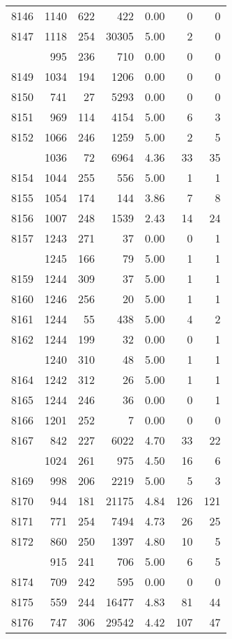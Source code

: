 \documentclass[
]{article}
\begin{document}
\begin{table}
\begin{tabular}[t]{lrrrrrr}
8146 & 1140 & 622 & 422 & 0.00 & 0 & 0\\
8147 & 1118 & 254 & 30305 & 5.00 & 2 & 0\\
\addlinespace
8148 & 995 & 236 & 710 & 0.00 & 0 & 0\\
8149 & 1034 & 194 & 1206 & 0.00 & 0 & 0\\
8150 & 741 & 27 & 5293 & 0.00 & 0 & 0\\
8151 & 969 & 114 & 4154 & 5.00 & 6 & 3\\
8152 & 1066 & 246 & 1259 & 5.00 & 2 & 5\\
\addlinespace
8153 & 1036 & 72 & 6964 & 4.36 & 33 & 35\\
8154 & 1044 & 255 & 556 & 5.00 & 1 & 1\\
8155 & 1054 & 174 & 144 & 3.86 & 7 & 8\\
8156 & 1007 & 248 & 1539 & 2.43 & 14 & 24\\
8157 & 1243 & 271 & 37 & 0.00 & 0 & 1\\
\addlinespace
8158 & 1245 & 166 & 79 & 5.00 & 1 & 1\\
8159 & 1244 & 309 & 37 & 5.00 & 1 & 1\\
8160 & 1246 & 256 & 20 & 5.00 & 1 & 1\\
8161 & 1244 & 55 & 438 & 5.00 & 4 & 2\\
8162 & 1244 & 199 & 32 & 0.00 & 0 & 1\\
\addlinespace
8163 & 1240 & 310 & 48 & 5.00 & 1 & 1\\
8164 & 1242 & 312 & 26 & 5.00 & 1 & 1\\
8165 & 1244 & 246 & 36 & 0.00 & 0 & 1\\
8166 & 1201 & 252 & 7 & 0.00 & 0 & 0\\
8167 & 842 & 227 & 6022 & 4.70 & 33 & 22\\
\addlinespace
8168 & 1024 & 261 & 975 & 4.50 & 16 & 6\\
8169 & 998 & 206 & 2219 & 5.00 & 5 & 3\\
8170 & 944 & 181 & 21175 & 4.84 & 126 & 121\\
8171 & 771 & 254 & 7494 & 4.73 & 26 & 25\\
8172 & 860 & 250 & 1397 & 4.80 & 10 & 5\\
\addlinespace
8173 & 915 & 241 & 706 & 5.00 & 6 & 5\\
8174 & 709 & 242 & 595 & 0.00 & 0 & 0\\
8175 & 559 & 244 & 16477 & 4.83 & 81 & 44\\
8176 & 747 & 306 & 29542 & 4.42 & 107 & 47\\

\end{tabular}
\end{table}
\end{document}
